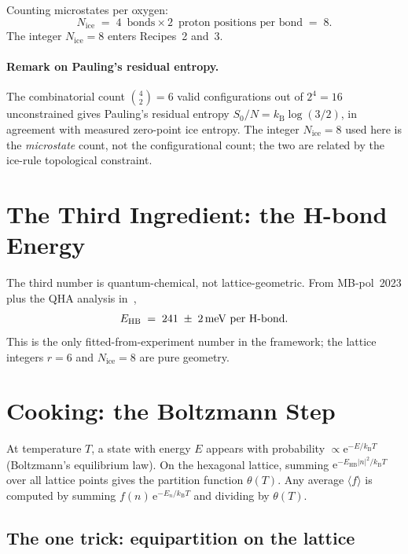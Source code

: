 \documentclass[final]{siamltex}
\newcommand{\EHB}{E_{\text{HB}}}
\newcommand{\Nrule}{N_{\text{ice}}}
\newcommand{\kB}{k_{\mathrm{B}}}
\newcommand{\e}{\mathrm{e}}
\begin{document}
Counting microstates per oxygen:
\begin{equation}\label{eq:ice}
\Nrule \;=\; 4\,\text{ bonds} \times 2\,\text{ proton positions per bond}
       \;=\; 8.
\end{equation}
The integer $\Nrule = 8$ enters Recipes~2 and~3.

\paragraph{Remark on Pauling's residual entropy.}
The combinatorial count $\binom{4}{2} = 6$ valid configurations
out of $2^4 = 16$ unconstrained gives Pauling's residual entropy
$S_0/N = \kB \log(3/2)$, in agreement with measured zero-point
ice entropy.  The integer $\Nrule = 8$ used here is the
\emph{microstate} count, not the configurational count;
the two are related by the ice-rule topological constraint.

\section{The Third Ingredient: the H-bond Energy}

The third number is quantum-chemical, not lattice-geometric.
From MB-pol~2023 plus the QHA analysis in~\cite{MamounPaperIV},
\begin{equation}
\EHB \;=\; 241 \;\pm\; 2 \text{\,meV per H-bond}.
\end{equation}
This is the only fitted-from-experiment number in the framework;
the lattice integers $r = 6$ and $\Nrule = 8$ are pure geometry.

\section{Cooking: the Boltzmann Step}

At temperature $T$, a state with energy $E$ appears with
probability $\propto \e^{-E/\kB T}$ (Boltzmann's equilibrium law).
On the hexagonal lattice, summing $\e^{-\EHB|n|^2/\kB T}$ over all
lattice points gives the partition function $\theta(T)$.  Any
average $\langle f \rangle$ is computed by summing
$f(n)\,\e^{-E_n/\kB T}$ and dividing by $\theta(T)$.

\subsection{The one trick: equipartition on the lattice}
\end{document}
